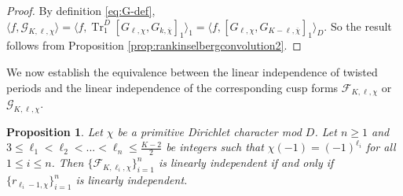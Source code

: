 \documentclass[11pt,letterpaper,reqno]{amsart}
\newcommand\ques[1]{\textcolor{blue}{\textbf{Question}: #1}}
\numberwithin{figure}{section}
\numberwithin{table}{section}
\theoremstyle{definition}
\theoremstyle{plain}
\newtheorem{proposition}[theorem]{Proposition}
\theoremstyle{definition}
\theoremstyle{definition}
\theoremstyle{remark}
\newtheorem{remark}{Remark}[section]
\numberwithin{equation}{section}
\theoremstyle{remark}
\DeclareMathOperator{\Tr}{Tr}
\begin{document}
\begin{proof}
    By definition \eqref{eq:G-def},
 $\langle f,\mathcal{G}_{K,\ell,\chi}\rangle=\langle f,\Tr_1^D[G_{\ell,\chi},G_{k,\overline{\chi}}]_1\rangle_1= \langle f,[G_{\ell,\chi},G_{K-\ell,\overline{\chi}}]_1\rangle_{D}.
    $
    So the result follows from Proposition \ref{prop:rankinselbergconvolution2}. %
\end{proof}
We now establish the equivalence between the linear independence of twisted periods and the linear independence of the corresponding cusp forms $\mathcal{F}_{K,\ell,\chi}$ or $\mathcal{G}_{K,\ell,\chi}$.
\begin{proposition}\label{prop:linearindeperiodtomodularform}
Let $\chi$ be a primitive Dirichlet character mod $D$. Let $n\geq1$ and $3\leq\ell_1<\ell_2<...<\ell_n\leq\frac{K-2}{2}$ be integers such that $\chi(-1)=(-1)^{\ell_i}$ for all $1\leq i\leq n$. Then
$\{\mathcal{F}_{K,\ell_i,\chi}\}_{i=1}^n$ is linearly independent if and only if $\{r_{\ell_i-1,\chi}\}_{i=1}^n$ is linearly independent.
\end{proposition}
\end{document}
